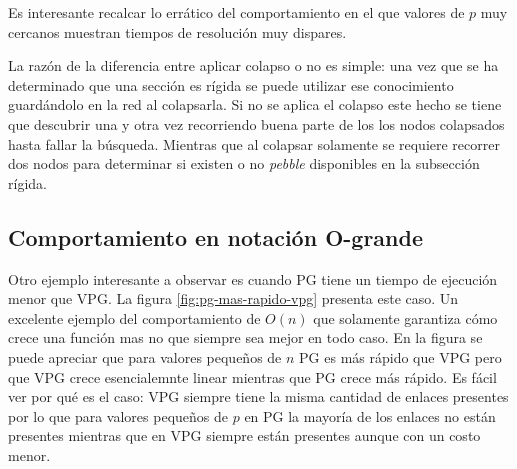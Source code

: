 Es interesante recalcar lo errático del comportamiento en el que valores de $p$ muy cercanos muestran tiempos de resolución muy dispares. 

La razón de la diferencia entre aplicar colapso o no es simple: una vez que se ha determinado que una sección es rígida se puede utilizar ese conocimiento guardándolo en la red al colapsarla. Si no se aplica el colapso este hecho se tiene que descubrir una y otra vez recorriendo buena parte de los los nodos colapsados hasta fallar la búsqueda. Mientras que al colapsar solamente se requiere recorrer dos nodos para determinar si existen o no \emph{pebble} disponibles en la subsección rígida.

\subsection{Comportamiento en notación O-grande}

Otro ejemplo interesante a observar es cuando PG tiene un tiempo de ejecución menor que VPG. La figura \ref{fig:pg-mas-rapido-vpg} presenta este caso. Un excelente ejemplo del comportamiento de $O(n)$ que solamente garantiza cómo crece una función mas no que siempre sea mejor en todo caso. En la figura se puede apreciar que para valores pequeños de $n$ PG es más rápido que VPG pero que VPG crece esencialemnte linear mientras que PG crece más rápido. Es fácil ver por qué es el caso: VPG siempre tiene la misma cantidad de enlaces presentes por lo que para valores pequeños de $p$ en PG la mayoría de los enlaces no están presentes mientras que en VPG siempre están presentes aunque con un costo menor.

